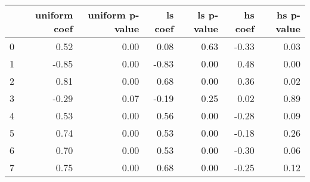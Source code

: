 \begin{tabular}{lrrrrrr}
\toprule
 & uniform coef & uniform p-value & ls coef & ls p-value & hs coef & hs p-value \\
\midrule
0 & 0.52 & 0.00 & 0.08 & 0.63 & -0.33 & 0.03 \\
1 & -0.85 & 0.00 & -0.83 & 0.00 & 0.48 & 0.00 \\
2 & 0.81 & 0.00 & 0.68 & 0.00 & 0.36 & 0.02 \\
3 & -0.29 & 0.07 & -0.19 & 0.25 & 0.02 & 0.89 \\
4 & 0.53 & 0.00 & 0.56 & 0.00 & -0.28 & 0.09 \\
5 & 0.74 & 0.00 & 0.53 & 0.00 & -0.18 & 0.26 \\
6 & 0.70 & 0.00 & 0.53 & 0.00 & -0.30 & 0.06 \\
7 & 0.75 & 0.00 & 0.68 & 0.00 & -0.25 & 0.12 \\
\bottomrule
\end{tabular}

